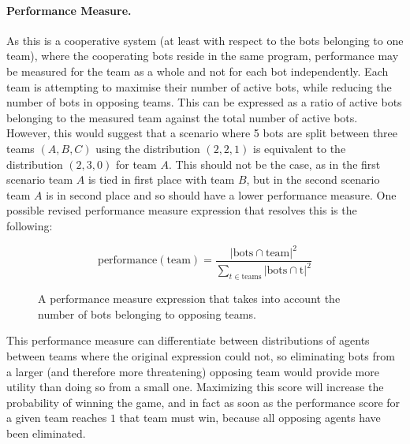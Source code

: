 \documentclass[a4paper,10pt]{article}
\begin{document}
\paragraph{Performance Measure.}
As this is a cooperative system (at least with respect to the bots belonging to one team), where the cooperating bots reside in the same program, performance may be measured for the team as a whole and not for each bot independently. Each team is attempting to maximise their number of active bots, while reducing the number of bots in opposing teams. This can be expressed as a ratio of active bots belonging to the measured team against the total number of active bots. However, this would suggest that a scenario where 5 bots are split between three teams $(A, B, C)$ using the distribution $(2, 2, 1)$ is equivalent to the distribution $(2, 3, 0)$ for team $A$. This should not be the case, as in the first scenario team $A$ is tied in first place with team $B$, but in the second scenario team $A$ is in second place and so should have a lower performance measure. One possible revised performance measure expression that resolves this is the following:

\begin{figure}[ht]
  \centering
  \begin{minipage}{0.8\textwidth}
    $$
      \text{performance}\left(\text{team}\right) = \frac
        {\left|\text{bots} \cap \text{team}\right|^2}
        {\sum_{t \in \text{teams}} \left|\text{bots} \cap \text{t}\right|^2}
    $$
    \caption{A performance measure expression that takes into account the number of bots belonging to opposing teams.}
  \end{minipage}
\end{figure}

\noindent
This performance measure can differentiate between distributions of agents between teams where the original expression could not, so eliminating bots from a larger (and therefore more threatening) opposing team would provide more utility than doing so from a small one. Maximizing this score will increase the probability of winning the game, and in fact as soon as the performance score for a given team reaches $1$ that team must win, because all opposing agents have been eliminated.
\end{document}
